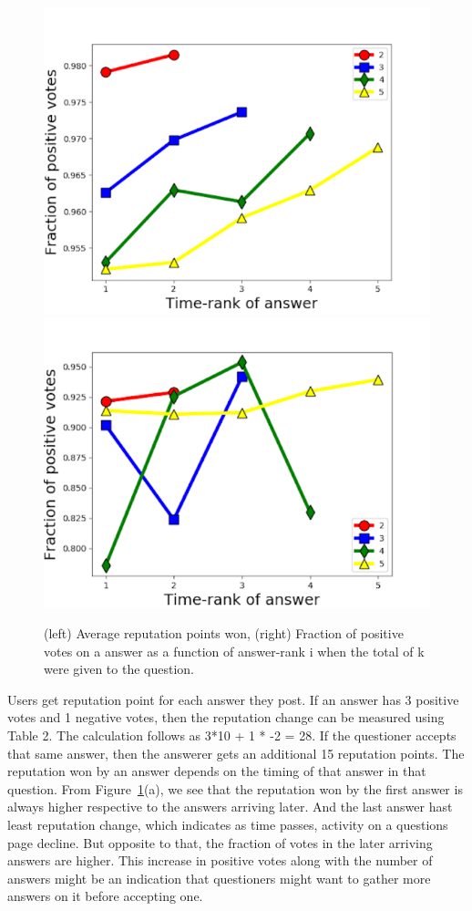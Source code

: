 \begin{figure}[!t]
    \centering
    \includegraphics[width=0.7\columnwidth]{img/Fig5_2010.pdf}
    \includegraphics[width=0.7\columnwidth]{img/Fig5_2017.pdf}
    \caption{(left) Average reputation points won, (right) Fraction of positive votes on a answer as a function of answer-rank i when the total of k were given to the question.}
    \label{fig:fig5}
\end{figure}
Users get reputation point for each answer they post. If an answer has 3 positive votes and 1 negative votes, then the reputation change can be measured using Table 2. The calculation follows as 3*10 + 1 * -2 = 28. If the questioner accepts that same answer, then the answerer gets an additional 15 reputation points.
The reputation won by an answer depends on the timing of that answer in that question. From Figure~\ref{fig:fig5}(a), we see that the reputation won by the first answer is always higher respective to the answers arriving later. And the last answer hast least reputation change, which indicates as time passes, activity on a questions page decline. But opposite to that, the fraction of votes in the later arriving answers are higher. This increase in positive votes along with the number of answers might be an indication that questioners might want to gather more answers on it before accepting one.


